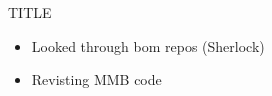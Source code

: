
\begin{frame}{TITLE}
    \begin{itemize}
        \item Looked through bom repos (Sherlock)
        \item Revisting MMB code
    \end{itemize}
\end{frame}

